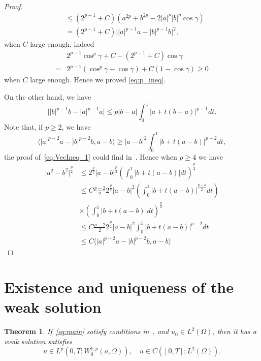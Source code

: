 \documentclass[11pt]{amsart}
\newtheorem{theorem}{Theorem}[section]
\theoremstyle{definition}
\numberwithin{equation}{section}
\newcommand*\abs[1]{\lvert#1\rvert}
\begin{document}
\begin{proof}
\begin{equation}
\begin{split}
			&\leq \left(2^{p-1}+C\right)\left(a^{2p} + b^{2p} - 2\abs{a}^p\abs{b}^p\cos{\gamma}\right)\\
			&= \left(2^{p-1}+C\right)\abs{\abs{a}^{p-1}a - \abs{b}^{p-1}b}^2,
		\end{split}
	\end{equation}
	when $C$ large enough, indeed
	\begin{equation}
		\begin{split}
			& 2^{p-1}\cos^p{\gamma} + C - \left(2^{p-1}+C\right)\cos{\gamma}\\
			={} & 2^{p-1}\left(\cos^p{\gamma} - \cos{\gamma}\right) + C\left(1-\cos{\gamma}\right)
			\geq 0
		\end{split}
	\end{equation}
	when $C$ large enough. Hence we proved \cref{eq:p_ineq}.

	On the other hand, we have
	\begin{equation}
		\abs{\abs{b}^{p-1}b - \abs{a}^{p-1}a} \leq p\abs{b-a}\int_0^1 \abs{a + t(b - a)}^{p-1}dt.
	\end{equation}
	Note that, if $p \geq 2$, we have
	\begin{equation}\label{eq:VecIneq_1}
		\langle \abs{a}^{p-2}a - \abs{b}^{p-2}b, a-b\rangle
		\geq \abs{a-b}^2\int_0^1 \abs{b + t(a - b)}^{p-2}dt,
	\end{equation}
	the proof of~\cref{eq:VecIneq_1} could find in~\cite{Lindqvist????Notes}.
	Hence when $p \geq 4$ we have
	\begin{equation}
		\begin{split}
			\abs{a^2 - b^2}^{\frac{p}{2}}
			&\leq 2^{\frac{p}{2}}\abs{a-b}^{\frac{p}{2}}
			\left(\int_0^1 \abs{b + t(a - b)}dt\right)^{\frac{p}{2}}\\
			&\leq C\frac{p-2}{2}2^{\frac{p}{2}}\abs{a-b}^2
			\left(\int_0^1 \abs{b + t(a - b)}^{\frac{p-4}{2}}dt\right)\\
			&\times\left(\int_0^1 \abs{b + t(a - b)}dt\right)^{\frac{p}{2}}\\
			&\leq C\frac{p-2}{2}2^{\frac{p}{2}}\abs{a-b}^2
			\int_0^1 \abs{b + t(a - b)}^{p-2}dt\\
			&\leq C \langle \abs{a}^{p-2}a - \abs{b}^{p-2}b, a-b\rangle
		\end{split}
	\end{equation}
\end{proof}

\section{Existence and uniqueness of the weak solution}
\begin{theorem}\label{thm:absorb}
If~\cref{eq:main} satisfy conditions in~\cite[thm 1.3]{Zhan2019Uniquenessa}, and $u_0 \in L^2(\Omega) $, then it has a weak solution satisfies
\begin{equation}
u \in L^p(0, T; W_0^{1,p}(a,\Omega)), \quad u \in C([0, T]; L^2(\Omega)).
\end{equation}
\end{theorem}
\end{document}
